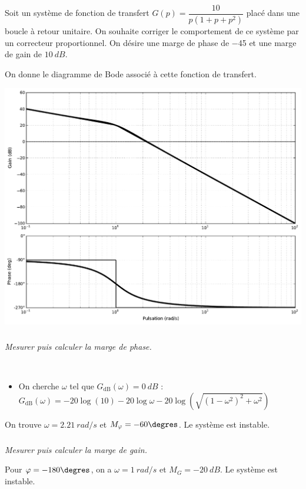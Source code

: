 \documentclass[10pt,fleqn]{article} %
\begin{document}
\begin{multicols}{2}
\setcounter{exo}{0}
Soit un système de fonction de transfert $G(p)=\dfrac{10}{p\left(1+p+p^2\right)}$ placé dans une boucle à retour unitaire. On souhaite corriger le comportement de ce système par un correcteur proportionnel. On désire une marge de phase de \SI{-45}{\degres} et une marge de gain de $\SI{10}{dB}$.

On donne le diagramme de Bode associé à cette fonction de transfert. 
\begin{center}
\includegraphics[width=\linewidth]{images/exo_01_bode}
\end{center}


\subparagraph{}\textit{Mesurer puis calculer la marge de phase.}
\ifprof
\begin{corrige}~\\
\begin{itemize}
\item On cherche $\omega$ tel que $G_{\text{dB}}(\omega)=\SI{0}{dB}$  :
$G_{\text{dB}}(\omega)=-20\log(10) -20\log\omega-20\log\left(\sqrt{(1-\omega^2)^2+\omega^2}\right)$
\end{itemize}

On trouve $\omega=\SI{2,21}{rad/s}$ et $M_{\varphi}=-60\degres$. Le système est instable.
\end{corrige}
\else
\fi

\subparagraph{}\textit{Mesurer puis calculer la marge de gain.}
\ifprof
\begin{corrige}
Pour $\varphi=-180\degres$, on a $\omega=\SI{1}{rad/s}$ et $M_{G}=\SI{-20}{dB}$. Le système est instable.
\end{corrige}
\else
\fi


\end{multicols}
\end{document}
